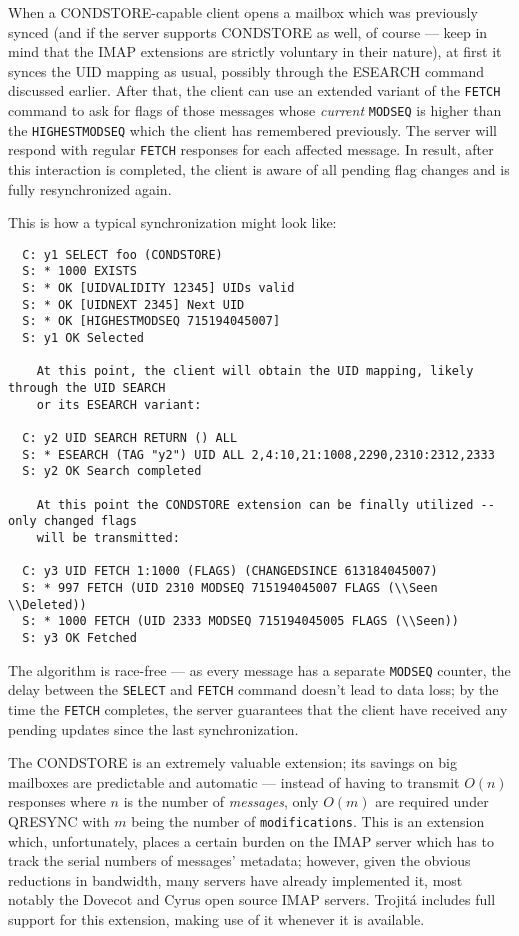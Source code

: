 \documentclass[trojita]{subfiles}
\begin{document}
When a CONDSTORE-capable client opens a mailbox which was previously synced (and if the server supports CONDSTORE as
well, of course --- keep in mind that the IMAP extensions are strictly voluntary in their nature), at first it synces the
UID mapping as usual, possibly through the ESEARCH command discussed earlier.  After that, the client can use an
extended variant of the {\tt FETCH} command to ask for flags of those messages whose {\em current} {\tt MODSEQ} is
higher than the {\tt HIGHESTMODSEQ} which the client has remembered previously.  The server will respond with regular
{\tt FETCH} responses for each affected message.  In result, after this interaction is completed, the client is aware of
all pending flag changes and is fully resynchronized again.

This is how a typical synchronization might look like:

\begin{verbatim}
  C: y1 SELECT foo (CONDSTORE)
  S: * 1000 EXISTS
  S: * OK [UIDVALIDITY 12345] UIDs valid
  S: * OK [UIDNEXT 2345] Next UID
  S: * OK [HIGHESTMODSEQ 715194045007]
  S: y1 OK Selected

    At this point, the client will obtain the UID mapping, likely through the UID SEARCH
    or its ESEARCH variant:

  C: y2 UID SEARCH RETURN () ALL
  S: * ESEARCH (TAG "y2") UID ALL 2,4:10,21:1008,2290,2310:2312,2333
  S: y2 OK Search completed

    At this point the CONDSTORE extension can be finally utilized -- only changed flags
    will be transmitted:

  C: y3 UID FETCH 1:1000 (FLAGS) (CHANGEDSINCE 613184045007)
  S: * 997 FETCH (UID 2310 MODSEQ 715194045007 FLAGS (\\Seen \\Deleted))
  S: * 1000 FETCH (UID 2333 MODSEQ 715194045005 FLAGS (\\Seen))
  S: y3 OK Fetched
\end{verbatim}

The algorithm is race-free --- as every message has a separate {\tt MODSEQ} counter, the delay between the {\tt SELECT}
and {\tt FETCH} command doesn't lead to data loss; by the time the {\tt FETCH} completes, the server guarantees that the
client have received any pending updates since the last synchronization.

The CONDSTORE is an extremely valuable extension; its savings on big mailboxes are predictable and automatic --- instead
of having to transmit $O(n)$ responses where $n$ is the number of {\em messages}, only $O(m)$ are required under QRESYNC
with $m$ being the number of {\tt modifications}.  This is an extension which, unfortunately, places a certain burden on
the IMAP server which has to track the serial numbers of messages' metadata; however, given the obvious reductions in
bandwidth, many servers have already implemented it, most notably the Dovecot and Cyrus open source IMAP servers.
Trojitá includes full support for this extension, making use of it whenever it is available.
\end{document}
